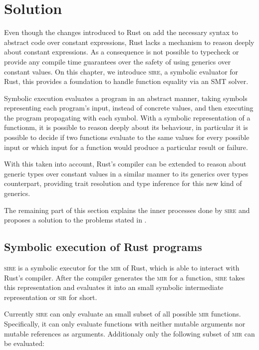 \chapter{Solution}
\label{chap:solution}

Even though the changes introduced to Rust on  add the
necessary syntax to abstract code over constant expressions, Rust lacks a
mechanism to reason deeply about constant expressions. As a consequence is not
possible to typecheck or provide any compile time guarantees over the safety of
using generics over constant values.  On this chapter, we introduce
\textsc{sire}, a symbolic evaluator for Rust, this provides a foundation to
handle function equality via an SMT solver. 

Symbolic execution evaluates a program in an abstract manner, taking symbols
representing each program's input, instead of concrete values, and then
executing the program propagating with each symbol. With a symbolic
representation of a functionm, it is possible to reason deeply about its
behaviour, in particular it is possible to decide if two functions evaluate to
the same values for every possible input or which input for a function would
produce a particular result or failure.

With this taken into account, Rust's compiler can be extended to reason about
generic types over constant values in a similar manner to its generics over
types counterpart, providing trait resolution and type inference for this new
kind of generics.

The remaining part of this section explains the inner processes done by
\textsc{sire} and proposes a solution to the problems stated in
.

\section{Symbolic execution of Rust programs}
\label{sec:symbolic_execution}

\textsc{sire} is a symbolic executor for the \textsc{mir} of Rust, which is
able to interact with Rust's compiler. After the compiler generates the
\textsc{mir} for a function, \textsc{sire} takes this representation and
evaluates it into an small symbolic intermediate representation or \textsc{sir}
for short.

Currently \textsc{sire} can only evaluate an small subset of all possible
\textsc{mir} functions. Specifically, it can only evaluate functions with
neither mutable arguments nor mutable references as arguments. Additionaly only
the following subset of \textsc{mir} can be evaluated:

